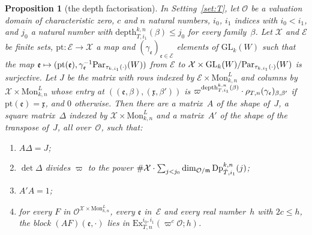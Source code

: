 \documentclass[11pt,a4paper]{article}
\newcommand{\m}[1]{\mbox{$#1$}}        %
\theoremstyle{plainx}
\newtheorem{proposition}[theorem]{Proposition}
\theoremstyle{uprightx}
\newcommand{\cO}{\mathcal{O}}
\newcommand{\cX}{\mathcal{X}}
\newcommand{\cE}{\mathcal{E}}
\newcommand{\fm}{\mathfrak{m}}
\newcommand{\fx}{\mathfrak{x}}
\newcommand{\fe}{\mathfrak{e}}
\newcommand{\GLk}{\mathrm{GL}_{k}}
\newcommand{\Par}{\mathrm{Par}}
\newcommand{\Fam}{\mathrm{Mon}_{k,n}^{L}}
\newcommand{\dep}[5]{\mathrm{depth}_{#1,#4}^{#2,#3}(#5)}
\newcommand{\exc}[6]{\mathrm{Ex}_{#1,#2}^{#3,#4}(#5;#6)}
\begin{document}
\begin{proposition}[the depth factorisation]\label{p:depthfact}
In Setting~\ref{set:T}, let $\cO$ be a valuation domain of characteristic zero, $c$ and $n$ natural numbers,
\m{i_0}, \m{i_1} indices with \m{i_0<i_1}, and $j_0$ a natural number with \m{\dep{T}{k}{n}{i_1}{\beta}\le j_0} for
every family~$\beta$. Let $\cX$ and $\cE$ be finite sets, \m{\mathrm{pt}\colon\cE\to\cX} a map and
\m{(\gamma_{\fe})_{\fe\in\cE}} elements of \m{\GLk(W)} such that the map
\m{\fe\mapsto(\mathrm{pt}(\fe),\gamma_{\fe}^{-1}\Par_{\twoBlock{k}{i_1}{\cdot}}(W))} from $\cE$ to
\m{\cX\times\GLk(W)/\Par_{\twoBlock{k}{i_1}{\cdot}}(W)} is surjective. Let $J$ be the matrix with rows indexed by
\m{\cE\times\Fam} and columns by \m{\cX\times\Fam} whose entry at \m{((\fe,\beta),(\fx,\beta'))} is
\m{\varpi^{\dep{T}{k}{n}{i_1}{\beta}}\cdot\letterRep{T}{n}{\gamma_{\fe}}_{\beta,\beta'}} if \m{\mathrm{pt}(\fe)=\fx}, and
$0$ otherwise. Then there are a matrix~$A$ of the shape of~$J$, a square matrix~$\Delta$ indexed by
\m{\cX\times\Fam} and a matrix~$A'$ of the shape of the transpose of~$J$, all over~$\cO$, such that:
\begin{enumerate}[label=\textup{(\roman*)},leftmargin=2.3em,itemsep=1pt,topsep=2pt]
\item \m{A\Delta=J};
\item \m{\det\Delta} divides $\varpi$ to the power
\m{\#\cX\cdot\sum_{j<j_0}\dim_{\cO/\fm}\deepForms{\bar T}{k}{n}{i_1}{j}};
\item \m{A'A=1};
\item for every $F$ in \m{\cO^{\cX\times\Fam}}, every $\fe$ in~$\cE$ and every real number~$h$ with
\m{2c\le h}, the block \m{(AF)(\fe,\cdot)} lies in \m{\exc{T}{n}{i_0}{i_1}{\varpi^{c}\cO}{h}}.
\end{enumerate}
\end{proposition}
\end{document}
